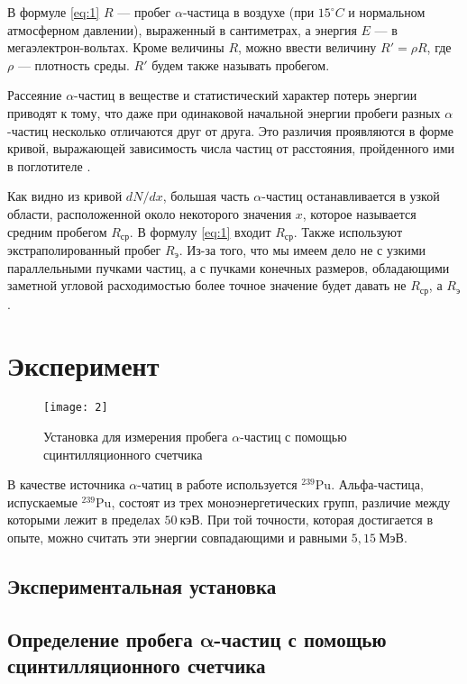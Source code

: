 \documentclass[a4paper, 12pt]{article}
\begin{document}
В формуле \eqref{eq:1} $R$ --- пробег $\alpha$-частица в воздухе (при
$15^\circ C$ и нормальном атмосферном давлении), выраженный в
сантиметрах, а энергия $E$ --- в мегаэлектрон-вольтах. Кроме величины
$R$, можно ввести величину $R' = \rho R$, где $\rho$ --- плотность
среды. $R'$ будем также называть пробегом.

Рассеяние $\alpha$-частиц в веществе и статистический характер потерь
энергии приводят к тому, что даже при одинаковой начальной энергии
пробеги разных $\alpha$-частиц несколько отличаются друг от друга. Это
различия проявляются в форме кривой, выражающей зависимость числа
частиц от расстояния, пройденного ими в поглотителе .

Как видно из кривой $d N/dx$, большая часть $\alpha$-частиц
останавливается в узкой области, расположенной около некоторого
значения $x$, которое называется средним пробегом $R_\text{ср}$. В
формулу \eqref{eq:1} входит $R_\text{ср}$. Также используют
экстраполированный пробег $R_\text{э}$. Из-за того, что мы имеем дело
не с узкими параллельными пучками частиц, а с пучками конечных
размеров, обладающими заметной угловой расходимостью более точное
значение будет давать не $R_\text{ср}$, а $R_\text{э}$.



\section{Эксперимент}

\begin{wrapfigure}[16]{l}{0.25\linewidth}
    \texttt{[image: 2]}
    \caption{Установка для измерения пробега $\alpha$-частиц с помощью
    сцинтилляционного счетчика}
    \label{fig:2}
\end{wrapfigure}

В качестве источника $\alpha$-чатиц в работе используется
$^{239}\text{Pu}$. Альфа-частица, испускаемые $ ^{239}\text{Pu}$,
состоят из трех моноэнергетических групп, различие между которыми
лежит в пределах $50\: \text{кэВ}$. При той точности, которая
достигается в опыте, можно считать эти энергии совпадающими и равными
$5,15\:\text{МэВ}$.



\subsection{Экспериментальная установка}



\subsection*{Определение пробега $\symbf{\alpha}$-частиц с помощью
сцинтилляционного счетчика}
\end{document}
